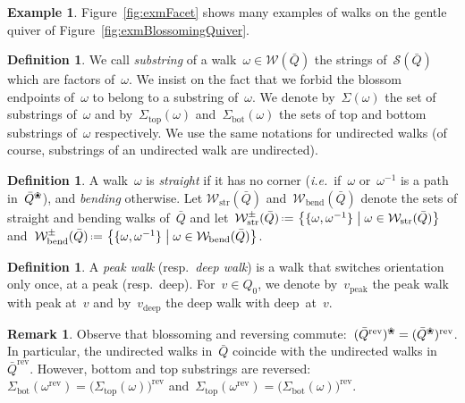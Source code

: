 \documentclass{amsart}
\theoremstyle{definition}
\newtheorem{definition}[theorem]{Definition}
\newtheorem{example}[theorem]{Example}
\newtheorem{remark}[theorem]{Remark}
\newcommand{\set}[2]{\left\{ #1 \;\middle|\; #2 \right\}} %
\newcommand{\eqdef}{\mbox{\,\raisebox{0.2ex}{\scriptsize\ensuremath{\mathrm:}}\ensuremath{=}\,}} %
\newcommand{\fref}[1]{Figure~\ref{#1}} %
\newcommand{\ie}{\textit{i.e.}~} %
\newcommand{\darkblue}{\color{darkblue}} %
\newcommand{\defn}[1]{\textsl{\darkblue #1}} %
\newcommand{\blossom}{^\text{\ding{96}}} %
\newcommand{\strings}{\mathcal{S}} %
\newcommand{\walks}{\mathcal{W}} %
\newcommand{\straightWalks}{\mathcal{W}_\mathrm{str}} %
\newcommand{\bendingWalks}{\mathcal{W}_\mathrm{bend}} %
\newcommand{\peak}{\mathrm{peak}} %
\newcommand{\deep}{\mathrm{deep}} %
\newcommand{\reversed}[1]{#1^{\mathrm{rev}}} %
\renewcommand{\top}{\mathrm{top}} %
\newcommand{\bottom}{\mathrm{bot}} %
\begin{document}
\begin{example}
\fref{fig:exmFacet} shows many examples of walks on the gentle quiver of \fref{fig:exmBlossomingQuiver}.
\end{example}

\begin{definition}
\label{def:substrings}
We call \defn{substring} of a walk~$\omega \in \walks(\bar Q)$ the strings of~$\strings(\bar Q)$ which are factors of~$\omega$.
We insist on the fact that we forbid the blossom endpoints of~$\omega$ to belong to a substring of~$\omega$.
We denote by~$\Sigma(\omega)$ the set of substrings of~$\omega$ and by~$\Sigma_\top(\omega)$ and~$\Sigma_\bottom(\omega)$ the sets of top and bottom substrings of~$\omega$ respectively.
We use the same notations for undirected walks (of course, substrings of an undirected walk are undirected).
\end{definition}

\begin{definition}
\label{def:straightBended}
A walk~$\omega$ is \defn{straight} if it has no corner (\ie if~$\omega$ or~$\omega^{-1}$ is a path in~$\bar Q\blossom$), and \defn{bending} otherwise. Let $\straightWalks(\bar Q)$ and~$\bendingWalks(\bar Q)$ denote the sets of straight and bending walks of~$\bar Q$ and let~$\straightWalks^\pm(\bar Q) \eqdef \set{\{\omega, \omega^{-1}\}}{\omega \in \straightWalks(\bar Q)}$ and~$\bendingWalks^\pm(\bar Q) \eqdef \set{\{\omega, \omega^{-1}\}}{\omega \in \bendingWalks(\bar Q)}$.
\end{definition}

\begin{definition}
\label{def: deep walk}
A \defn{peak walk} (resp.~\defn{deep walk}) is a walk that switches orientation only once, at a peak (resp.~deep). For~$v \in Q_0$, we denote by~$v_\peak$ the peak walk with peak at~$v$ and by~$v_\deep$ the deep walk with deep~at~$v$.
\end{definition}

\begin{remark}
\label{rem:reverseBlossomingQuiver}
Observe that blossoming and reversing commute:~$(\reversed{\bar Q})\blossom = \reversed{(\bar Q\blossom)}$.
In particular, the undirected walks in~$\bar Q$ coincide with the undirected walks in~$\reversed{\bar Q}$.
However, bottom and top substrings are reversed: $\Sigma_\bottom(\reversed{\omega}) = \reversed{\big( \Sigma_\top(\omega) \big)}$ and~$\Sigma_\top(\reversed{\omega}) = \reversed{\big( \Sigma_\bottom(\omega) \big)}$.
\end{remark}
\end{document}
